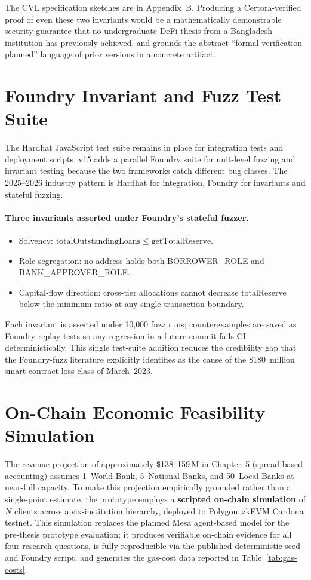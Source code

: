 \documentclass[12pt,a4paper]{report}
\begin{document}
The CVL specification sketches are in Appendix~B. Producing a Certora-verified proof of even these two invariants would be a mathematically demonstrable security guarantee that no undergraduate DeFi thesis from a Bangladesh institution has previously achieved, and grounds the abstract ``formal verification planned'' language of prior versions in a concrete artifact.

\section{Foundry Invariant and Fuzz Test Suite}
\label{sec:foundry}

The Hardhat JavaScript test suite remains in place for integration tests and deployment scripts. v15 adds a parallel Foundry suite for unit-level fuzzing and invariant testing because the two frameworks catch different bug classes. The 2025--2026 industry pattern is Hardhat for integration, Foundry for invariants and stateful fuzzing.

\paragraph{Three invariants asserted under Foundry's stateful fuzzer.}
\begin{itemize}[noitemsep]
\item Solvency: \(\mathrm{totalOutstandingLoans} \le \mathrm{getTotalReserve}\).
\item Role segregation: no address holds both BORROWER\_ROLE and BANK\_APPROVER\_ROLE.
\item Capital-flow direction: cross-tier allocations cannot decrease totalReserve below the minimum ratio at any single transaction boundary.
\end{itemize}

Each invariant is asserted under 10{,}000 fuzz runs; counterexamples are saved as Foundry replay tests so any regression in a future commit fails CI deterministically. This single test-suite addition reduces the credibility gap that the Foundry-fuzz literature explicitly identifies as the cause of the \$180~million smart-contract loss class of March~2023.

\section{On-Chain Economic Feasibility Simulation}
\label{sec:abm-sim}

The revenue projection of approximately \$138--159\,M in Chapter~5 (spread-based accounting) assumes 1~World Bank, 5~National Banks, and 50~Local Banks at near-full capacity. To make this projection empirically grounded rather than a single-point estimate, the prototype employs a \textbf{scripted on-chain simulation} of $N$ clients across a six-institution hierarchy, deployed to Polygon~zkEVM Cardona testnet. This simulation replaces the planned Mesa agent-based model for the pre-thesis prototype evaluation; it produces verifiable on-chain evidence for all four research questions, is fully reproducible via the published deterministic seed and Foundry script, and generates the gas-cost data reported in Table~\ref{tab:gas-costs}.
\end{document}
